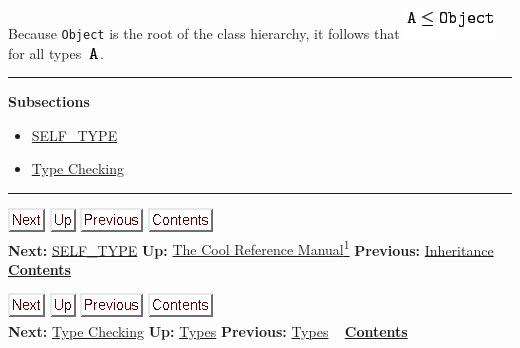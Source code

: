 \documentclass[]{article}
\begin{document}
Because \texttt{Object} is the root of the class hierarchy, it follows
that \includegraphics{img7.png} for all types
\includegraphics{img8.png}.

\begin{center}\rule{3in}{0.4pt}\end{center}

\textbf{Subsections}

\begin{itemize}
\itemsep1pt\parskip0pt
\item
  \href{node8.html}{SELF\_TYPE}
\item
  \href{node9.html}{Type Checking}
\end{itemize}

\begin{center}\rule{3in}{0.4pt}\end{center}

\href{node8.html}{\includegraphics{next.png}}
\href{cool-manual.html}{\includegraphics{up.png}}
\href{node6.html}{\includegraphics{prev.png}}
\href{node1.html}{\includegraphics{contents.png}} \\ \textbf{Next:}
\href{node8.html}{SELF\_TYPE} \textbf{Up:} \href{cool-manual.html}{The
Cool Reference Manual\textsuperscript{1}} \textbf{Previous:}
\href{node6.html}{Inheritance} ~ \textbf{\href{node1.html}{Contents}}

\href{node9.html}{\includegraphics{next.png}}
\href{node7.html}{\includegraphics{up.png}}
\href{node7.html}{\includegraphics{prev.png}}
\href{node1.html}{\includegraphics{contents.png}} \\ \textbf{Next:}
\href{node9.html}{Type Checking} \textbf{Up:} \href{node7.html}{Types}
\textbf{Previous:} \href{node7.html}{Types} ~
\textbf{\href{node1.html}{Contents}} \\ \\
\end{document}

